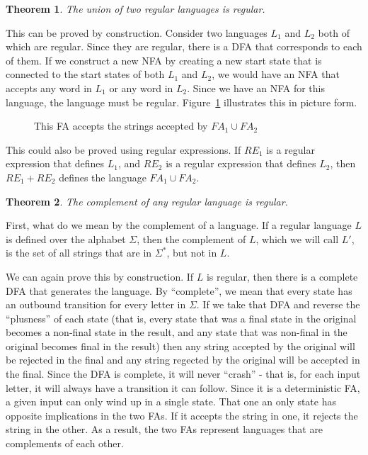 \documentclass[letterpaper,12pt,openany,reqno]{book}%
\newcommand{\fanonterminalnode}[2] {\node at (#1) (#2) [circle, draw, minimum size=24pt] {#2};}
\newcommand{\fatransition}[3] {\draw [->] (#1) -- (#2) node [midway, above] {#3};}
\newtheorem{theorem}{Theorem}
\begin{document}
\begin{theorem}
The union of two regular languages is regular.
\end{theorem}
This can be proved by construction. Consider two languages $L_1$ and $L_2$ both of which are regular. Since they are regular, there is a DFA that corresponds to each of them. If we construct a new NFA by creating a new start state that is connected to the start states of both $L_1$ and $L_2$, we would have an NFA that accepts any word in $L_1$ or any word in $L_2$. Since we have an NFA for this language, the language must be regular. Figure~\ref{F.union.re} illustrates this in picture form.

\begin{figure}[hbt]
\centering
{}
\caption[Union of to regular expressions]{This FA accepts the strings accepted by $FA_1 \cup FA_2$}
\label{F.union.re}
\end{figure}
This could also be proved using regular expressions. If $RE_1$ is a regular expression that defines $L_1$, and $RE_2$ is a regular expression that defines $L_2$, then $RE_1 + RE_2$ defines the language $FA_1 \cup FA_2$.

\begin{theorem}
The complement of any regular language is regular.
\end{theorem}
First, what do we mean by the complement of a language. If a regular language $L$ is defined over the alphabet $\Sigma$, then the complement of $L$, which we will call $L'$, is the set of all strings that are in $\Sigma ^*$, but not in $L$.

We can again prove this by construction. If $L$ is regular, then there is a complete DFA that generates the language. By ``complete'', we mean that every state has an outbound transition for every letter in $\Sigma$. If we take that DFA and reverse the ``plusness'' of each state (that is, every state that was a final state in the original becomes a non-final state in the result, and any state that was non-final in the original becomes final in the result) then any string accepted by the original will be rejected in the final and any string regected by the original will be accepted in the final. Since the DFA is complete, it will never ``crash'' - that is, for each input letter, it will always have a transition it can follow. Since it is a deterministic FA, a given input can only wind up in a single state. That one an only state has opposite implications in the two FAs. If it accepts the string in one, it rejects the string in the other. As a result, the two FAs represent languages that are complements of each other.
\end{document}
